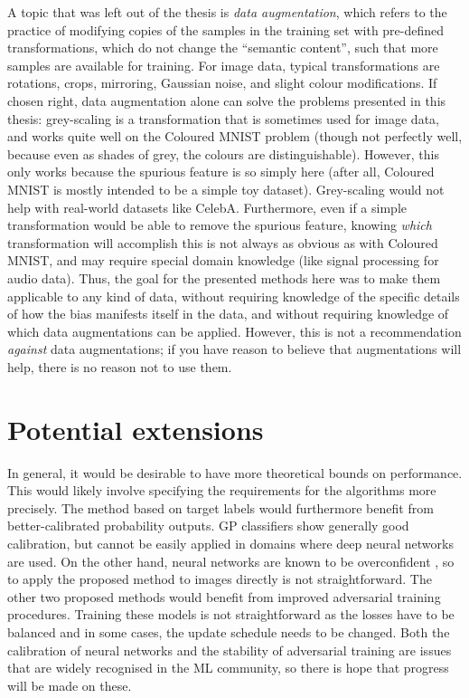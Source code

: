A topic that was left out of the thesis is \emph{data augmentation},
which refers to the practice of modifying copies of the samples in the training set
with pre-defined transformations, which do not change the ``semantic content'',
such that more samples are available for training.
For image data, typical transformations are rotations, crops, mirroring, Gaussian noise, and slight colour modifications.
If chosen right, data augmentation alone can solve the problems presented in this thesis:
grey-scaling is a transformation that is sometimes used for image data,
and works quite well on the Coloured MNIST problem
(though not perfectly well, because even as shades of grey, the colours are distinguishable).
However, this only works because the spurious feature is so simply here
(after all, Coloured MNIST is mostly intended to be a simple toy dataset).
Grey-scaling would not help with real-world datasets like CelebA.
Furthermore, even if a simple transformation would be able to remove the spurious feature,
knowing \emph{which} transformation will accomplish this is not always as obvious as with Coloured MNIST,
and may require special domain knowledge (like signal processing for audio data).
Thus, the goal for the presented methods here was to make them applicable to any kind of data,
without requiring knowledge of the specific details of how the bias manifests itself in the data,
and without requiring knowledge of which data augmentations can be applied.
However, this is not a recommendation \emph{against} data augmentations;
if you have reason to believe that augmentations will help,
there is no reason not to use them.

\section{Potential extensions}\label{sec:potential-extentions}
%
In general, it would be desirable to have more theoretical bounds on performance.
This would likely involve specifying the requirements for the algorithms more precisely.
The method based on target labels would furthermore benefit from better-calibrated probability outputs.
\acf{GP} classifiers show generally good calibration,
but cannot be easily applied in domains where deep neural networks are used.
On the other hand, neural networks are known to be overconfident
\citep[especially when using ReLU activations;][]{hein2019relu},
so to apply the proposed method to images directly is not straightforward.
The other two proposed methods would benefit from improved adversarial training procedures.
Training these models is not straightforward as the losses have to be balanced
and in some cases, the update schedule needs to be changed.
Both the calibration of neural networks and the stability of adversarial training
are issues that are widely recognised in the \ac{ML} community,
so there is hope that progress will be made on these.

